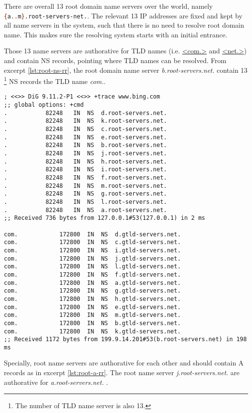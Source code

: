 There are overall 13 root domain name servers over the world,
namely \lstinline[language=bash]|{a..m}.root-servers-net.|. The
relevant 13 IP addresses are fixed and kept by all name servers in
the system, such that there is no need to resolve root domain
name. This makes sure the resolving system starts with an initial
entrance.

Those 13 name servers are authorative for TLD names
(i.e. \uline{<com.>} and \uline{<net.>}) and contain NS records,
pointing where TLD names can be resolved. From excerpt
\ref{lst:root-ns-rr}, the root domain name server
\textit{b.root-servers.net.} contain 13 \footnote{The number of
  TLD name server is also 13.} NS records the TLD name
\textit{com.}.

\begin{minipage}{1.0\linewidth}
\begin{lstlisting}[caption={RRs in Root Name Server},label={lst:root-ns-rr},basicstyle=\tiny\ttfamily]
; <<>> DiG 9.11.2-P1 <<>> +trace www.bing.com
;; global options: +cmd
.			82248	IN	NS	d.root-servers.net.
.			82248	IN	NS	k.root-servers.net.
.			82248	IN	NS	c.root-servers.net.
.			82248	IN	NS	e.root-servers.net.
.			82248	IN	NS	b.root-servers.net.
.			82248	IN	NS	j.root-servers.net.
.			82248	IN	NS	h.root-servers.net.
.			82248	IN	NS	i.root-servers.net.
.			82248	IN	NS	f.root-servers.net.
.			82248	IN	NS	m.root-servers.net.
.			82248	IN	NS	g.root-servers.net.
.			82248	IN	NS	l.root-servers.net.
.			82248	IN	NS	a.root-servers.net.
;; Received 736 bytes from 127.0.0.1#53(127.0.0.1) in 2 ms

com.			172800	IN	NS	d.gtld-servers.net.
com.			172800	IN	NS	c.gtld-servers.net.
com.			172800	IN	NS	i.gtld-servers.net.
com.			172800	IN	NS	j.gtld-servers.net.
com.			172800	IN	NS	l.gtld-servers.net.
com.			172800	IN	NS	f.gtld-servers.net.
com.			172800	IN	NS	a.gtld-servers.net.
com.			172800	IN	NS	g.gtld-servers.net.
com.			172800	IN	NS	h.gtld-servers.net.
com.			172800	IN	NS	e.gtld-servers.net.
com.			172800	IN	NS	m.gtld-servers.net.
com.			172800	IN	NS	b.gtld-servers.net.
com.			172800	IN	NS	k.gtld-servers.net.
;; Received 1172 bytes from 199.9.14.201#53(b.root-servers.net) in 198 ms
\end{lstlisting}
\end{minipage}

Specially, root name servers are authorative for each other and
should contain A records as in excerpt \ref{lst:root-a-rr}. The
root name server \textit{j.root-servers.net.} are authorative for
\textit{a.root-servers.net.} .

